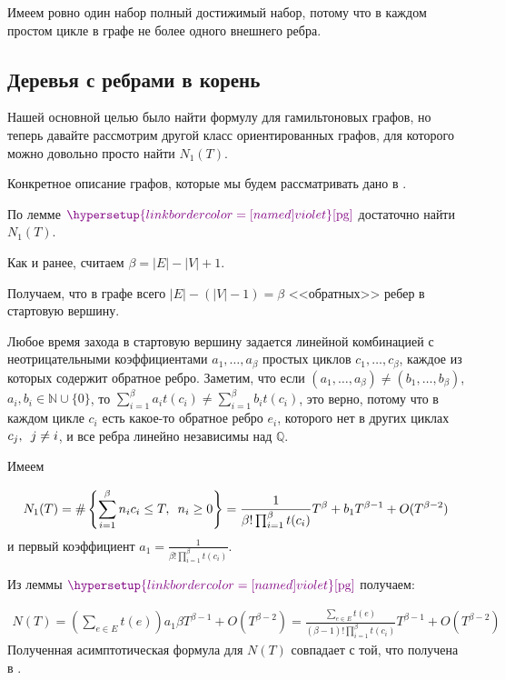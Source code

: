 \documentclass{article}
\makeatletter
\newcommand{\squad}{
    \hspace{0.5em}
}
\let\@msm@th@eqref\eqref
\renewcommand{\eqref}[1]{%
  \begingroup
  \leavevmode
  \color{violet}%
  \hypersetup{linkbordercolor=[named]{violet}}%
  \@msm@th@eqref{#1}%
  \endgroup
}
\makeatother
\begin{document}
Имеем ровно один набор полный достижимый набор, потому что в каждом простом цикле в графе не более одного внешнего ребра.

\subsection{Деревья с ребрами в корень}

Нашей основной целью было найти формулу для гамильтоновых графов, но теперь давайте рассмотрим другой класс ориентированных графов, для которого можно довольно просто найти $N_{1}(T)$.

Конкретное описание графов, которые мы будем рассматривать дано в \cite{2021}.

По лемме $\eqref{pg}$ достаточно найти $N_{1}(T)$.

Как и ранее, считаем $\beta = |E| - |V| + 1$.

Получаем, что в графе всего $|E| - (|V| - 1) = \beta$ <<обратных>> ребер в стартовую вершину.

Любое время захода в стартовую вершину задается линейной комбинацией с неотрицательными коэффициентами $a_{1}, \ldots, a_{\beta}$ простых циклов $c_{1}, \ldots, c_{\beta}$, каждое из которых содержит обратное ребро. 
Заметим, что если $(a_{1}, \ldots, a_{\beta}) \neq (b_{1}, \ldots, b_{\beta})$, $a_{i}, b_{i} \in \mathbb{N} \cup \{0\}$, то $\sum_{i = 1}^{\beta}a_{i}t(c_{i}) \neq \sum_{i = 1}^{\beta}b_{i}t(c_{i})$, это верно, потому что в каждом цикле $c_{i}$ есть какое-то обратное ребро $e_{i}$, которого нет в других циклах $c_{j}, \squad j \neq i$, и все ребра линейно независимы над $\mathbb{Q}$.

Имеем 

\begin{gather*}
    N_{1}(T) = \#\left\{ \sum_{i = 1}^{\beta}{n_{i}c_{i}} \leq T, \squad n_{i} \geq 0\right\} = \frac{1}{\beta!\prod_{i = 1}^{\beta}{t(c_{i})}}T^{\beta} + b_{1}T^{\beta - 1} + O(T^{\beta - 2})
\end{gather*}
и первый коэффициент $a_{1} = \frac{1}{\beta!\prod_{i = 1}^{\beta}{t(c_{i})}}$.

Из леммы $\eqref{pg}$ получаем: 

\begin{gather*}
    N(T) = \left(\sum_{e \in E}{t(e)}\right)a_{1}\beta T^{\beta - 1} + O(T^{\beta - 2}) = \frac{\sum_{e \in E}{t(e)}}{(\beta - 1)!\prod_{i = 1}^{\beta}{t(c_{i})}}T^{\beta - 1} + O(T^{\beta - 2})
\end{gather*}
{}
Полученная асимптотическая формула для $N(T)$ совпадает с той, что получена в \cite{2021}.
\end{document}
